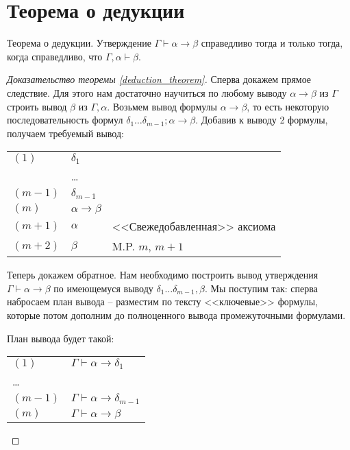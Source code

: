 \section{Теорема о дедукции}

\begin{theorem}\label{deduction_theorem}{Теорема о дедукции.}
Утверждение $\Gamma \vdash \alpha \rightarrow \beta$ справедливо тогда и 
только тогда, когда справедливо, что $\Gamma, \alpha \vdash \beta$.
\end{theorem}

\begin{proof}[Доказательство теоремы \ref{deduction_theorem}]

Сперва докажем прямое следствие. Для этого нам 
достаточно научиться по любому выводу $\alpha \rightarrow \beta$ из $\Gamma$ строить 
вывод $\beta$ из $\Gamma, \alpha$. Возьмем вывод 
формулы $\alpha \rightarrow \beta$, то есть некоторую последовательность 
формул $\delta_1 \dots \delta_{m-1}; \alpha \rightarrow \beta$.
Добавив к выводу 2 формулы, получаем требуемый вывод:

\vspace{0.2cm}
\begin{tabular}{lll}
$(1)$ & $\delta_1$\\
& \dots\\
$(m-1)$ & $\delta_{m-1}$\\
$(m)$ & $\alpha \rightarrow \beta$\\
$(m+1)$ & $\alpha$ & <<Свежедобавленная>> аксиома \\
$(m+2)$ & $\beta$ & M.P. $m$, $m+1$\\
\end{tabular}
\vspace{0.2cm}

Теперь докажем обратное. Нам необходимо построить вывод утверждения 
$\Gamma \vdash \alpha \rightarrow \beta$ по имеющемуся выводу 
$\delta_1 \dots \delta_{m-1}, \beta$.
Мы поступим так: сперва набросаем план вывода -- разместим по тексту 
<<ключевые>> формулы, которые потом дополним до полноценного вывода 
промежуточными формулами. 

План вывода будет такой:

\begin{tabular}{ll}
$(1)$ & $\Gamma \vdash \alpha \rightarrow \delta_1$\\
\dots\\
$(m-1)$ & $\Gamma \vdash \alpha \rightarrow \delta_{m-1}$\\
$(m)$ & $\Gamma \vdash \alpha \rightarrow \beta$
\end{tabular}


\end{proof}
